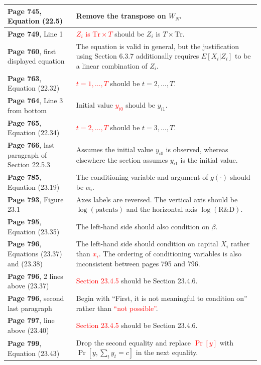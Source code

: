 \documentclass[10pt, a4paper]{article}
\newcommand{\red}[1]{\textcolor{red}{#1}}
\newcommand{\green}[1]{\textcolor{green!50!black}{#1}}
\begin{document}
\begin{longtable}{|R{.41\textwidth}|R{.57\textwidth}|}
	\textbf{Page 745}, Equation (22.5) & Remove the transpose on \green{$W_N$}. \\ \hline
	\textbf{Page 749}, Line 1 & \red{$Z_i$ is $\mathrm{Tr}\times T$} should be \green{$Z_i$ is $T\times \mathrm{Tr}$}. \\ \hline
	\textbf{Page 760}, first displayed equation & The equation is valid in general, but the justification using Section 6.3.7 additionally requires \green{$E[X_i|Z_i]$} to be a linear combination of \green{$Z_i$}. \\ \hline
	\textbf{Page 763}, Equation (22.32) & \red{$t=1,\ldots,T$} should be \green{$t=2,\ldots,T$}. \\ \hline
	\textbf{Page 764}, Line 3 from bottom & Initial value \red{$y_{i0}$} should be \green{$y_{i1}$}. \\ \hline
	\textbf{Page 765}, Equation (22.34) & \red{$t=2,\ldots,T$} should be \green{$t=3,\ldots,T$}. \\ \hline
	\textbf{Page 766}, last paragraph of Section 22.5.3 & Assumes the initial value \green{$y_{i0}$} is observed, whereas elsewhere the section assumes \green{$y_{i1}$} is the initial value. \\ \hline
	\textbf{Page 785}, Equation (23.19) & The conditioning variable and argument of \green{$g(\cdot)$} should be \green{$\alpha_i$}. \\ \hline
	\textbf{Page 793}, Figure 23.1 & Axes labels are reversed. The vertical axis should be \green{$\log(\text{patents})$} and the horizontal axis \green{$\log(\text{R\&D})$}. \\ \hline
	\textbf{Page 795}, Equation (23.35) & The left-hand side should also condition on \green{$\beta$}. \\ \hline
	\textbf{Page 796}, Equations (23.37) and (23.38) & The left-hand side should condition on capital \green{$X_i$} rather than \red{$x_i$}. The ordering of conditioning variables is also inconsistent between pages 795 and 796. \\ \hline
	\textbf{Page 796}, 2 lines above (23.37) & \red{Section 23.4.5} should be \green{Section 23.4.6}. \\ \hline
	\textbf{Page 796}, second last paragraph & Begin with \green{``First, it is not meaningful to condition on''} rather than \red{``not possible''}. \\ \hline
	\textbf{Page 797}, line above (23.40) & \red{Section 23.4.5} should be \green{Section 23.4.6}. \\ \hline
	\textbf{Page 799}, Equation (23.43) & Drop the second equality and replace \red{$\Pr[y]$} with \green{$\Pr[y,\sum_t y_t=c]$} in the next equality. \\ \hline

\end{longtable}
\end{document}
